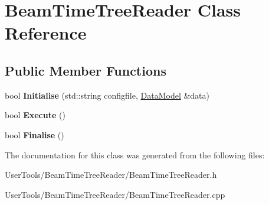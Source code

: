 \hypertarget{classBeamTimeTreeReader}{
\section{BeamTimeTreeReader Class Reference}
\label{classBeamTimeTreeReader}
}
\subsection*{Public Member Functions}
\begin{DoxyCompactItemize}
\item 
\hypertarget{classBeamTimeTreeReader_a156a2386c5a9e9a6aab28a4fbf6df659}{
bool {\bfseries Initialise} (std::string configfile, \hyperlink{classDataModel}{DataModel} \&data)}
\label{classBeamTimeTreeReader_a156a2386c5a9e9a6aab28a4fbf6df659}

\item 
\hypertarget{classBeamTimeTreeReader_ae9094c6a47c9baa1a2394c50daa4fdb3}{
bool {\bfseries Execute} ()}
\label{classBeamTimeTreeReader_ae9094c6a47c9baa1a2394c50daa4fdb3}

\item 
\hypertarget{classBeamTimeTreeReader_ad6b505e7513ac9ab5b950cb15095ac79}{
bool {\bfseries Finalise} ()}
\label{classBeamTimeTreeReader_ad6b505e7513ac9ab5b950cb15095ac79}

\end{DoxyCompactItemize}


The documentation for this class was generated from the following files:\begin{DoxyCompactItemize}
\item 
UserTools/BeamTimeTreeReader/BeamTimeTreeReader.h\item 
UserTools/BeamTimeTreeReader/BeamTimeTreeReader.cpp\end{DoxyCompactItemize}
